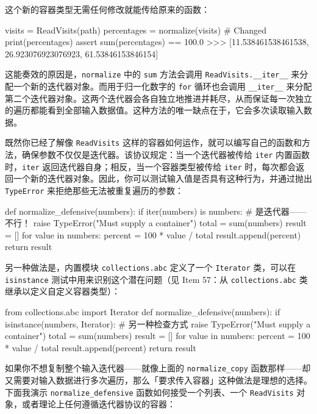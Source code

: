 这个新的容器类型无需任何修改就能传给原来的函数：

\begin{codebox}[python]
visits = ReadVisits(path)
percentages = normalize(visits)  # Changed
print(percentages)
assert sum(percentages) == 100.0
>>>
[11.538461538461538, 26.923076923076923, 61.53846153846154]
\end{codebox}

这能奏效的原因是，\texttt{normalize} 中的 \texttt{sum} 方法会调用 \texttt{ReadVisits.\_\_iter\_\_} 来分配一个新的迭代器对象。而用于归一化数字的 \texttt{for} 循环也会调用 \texttt{\_\_iter\_\_} 来分配第二个迭代器对象。这两个迭代器会各自独立地推进并耗尽，从而保证每一次独立的遍历都能看到全部输入数据值。这种方法的唯一缺点在于，它会多次读取输入数据。

既然你已经了解像 \texttt{ReadVisits} 这样的容器如何运作，就可以编写自己的函数和方法，确保参数不仅仅是迭代器。该协议规定：当一个迭代器被传给 \texttt{iter} 内置函数时，\texttt{iter} 返回迭代器自身；相反，当一个容器类型被传给 \texttt{iter} 时，每次都会返回一个新的迭代器对象。因此，你可以测试输入值是否具有这种行为，并通过抛出 \texttt{TypeError} 来拒绝那些无法被重复遍历的参数：

\begin{codebox}[python]
def normalize_defensive(numbers):
    if iter(numbers) is numbers:  # 是迭代器——不行！
        raise TypeError("Must supply a container")
    total = sum(numbers)
    result = []
    for value in numbers:
        percent = 100 * value / total
        result.append(percent)
    return result
\end{codebox}

另一种做法是，内置模块 \texttt{collections.abc} 定义了一个 \texttt{Iterator} 类，可以在 \texttt{isinstance} 测试中用来识别这个潜在问题（见 Item 57：从 \texttt{collections.abc} 类继承以定义自定义容器类型）：

\begin{codebox}[python]
from collections.abc import Iterator
def normalize_defensive(numbers):
    if isinstance(numbers, Iterator):  # 另一种检查方式
        raise TypeError("Must supply a container")
    total = sum(numbers)
    result = []
    for value in numbers:
        percent = 100 * value / total
        result.append(percent)
    return result
\end{codebox}

如果你不想复制整个输入迭代器——就像上面的 \texttt{normalize\_copy} 函数那样——却又需要对输入数据进行多次遍历，那么「要求传入容器」这种做法是理想的选择。下面我演示 \texttt{normalize\_defensive} 函数如何接受一个列表、一个 \texttt{ReadVisits} 对象，或者理论上任何遵循迭代器协议的容器：

